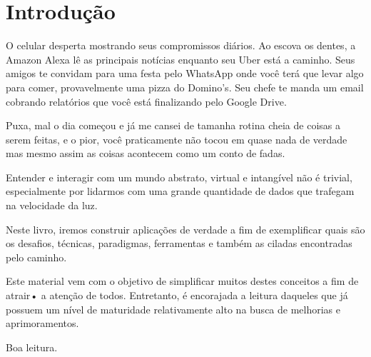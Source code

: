 \chapter{Introdução}

O celular desperta mostrando seus compromissos diários. Ao escova os dentes, a Amazon Alexa lê as principais notícias enquanto seu Uber está a caminho. Seus amigos te convidam para uma festa pelo WhatsApp onde você terá que levar algo para comer, provavelmente uma pizza do Domino's. Seu chefe te manda um email cobrando relatórios que você está finalizando pelo Google Drive.

Puxa, mal o dia começou e já me cansei de tamanha rotina cheia de coisas a serem feitas, e o pior, você praticamente não tocou em quase nada de verdade mas mesmo assim as coisas acontecem como um conto de fadas.

Entender e interagir com um mundo abstrato, virtual e intangível não é trivial, especialmente por lidarmos com uma grande quantidade de dados que trafegam na velocidade da luz.

Neste livro, iremos construir aplicações de verdade a fim de exemplificar quais são os desafios, técnicas, paradigmas, ferramentas e também as ciladas encontradas pelo caminho. 

Este material vem com o objetivo de simplificar muitos destes conceitos a fim de atrair• a atenção de todos. Entretanto, é encorajada a leitura daqueles que já possuem um nível de maturidade relativamente alto na busca de melhorias e aprimoramentos. 

Boa leitura.